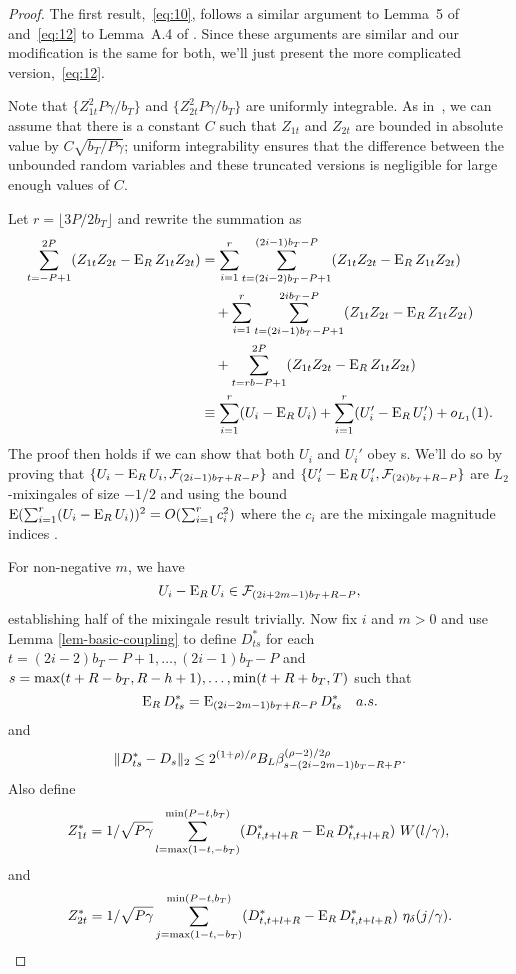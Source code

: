 \documentclass[11pt]{article}
\begin{document}
\begin{proof}
\newcommand{\UFiltration}[1]{\ensuremath{\mathcal{F}_{(#1)b_{T}+R-P}}}%
The first result,~\eqref{eq:10}, follows a similar argument to Lemma~5
of \citet{Jon:97} and~\eqref{eq:12} to Lemma~A.4 of \citet{JoD:00}.
Since these arguments are similar and our modification is the same for
both, we'll just present the more complicated version,~\eqref{eq:12}.

Note that $\{Z_{1t}^2 P\gamma/b_T\}$ and $\{Z_{2t}^2 P\gamma/b_T\}$
are uniformly integrable.  As in~\citet[Lemma A.4]{JoD:00}, we can
assume that there is a constant $C$ such that $Z_{1t}$ and $Z_{2t}$
are bounded in absolute value by $C\sqrt{b_T/P\gamma}$; uniform
integrability ensures that the difference between the unbounded random
variables and these truncated versions is negligible for large enough
values of $C$.

Let $r = \lfloor 3P/2b_T \rfloor$ and rewrite the summation as
\begin{align*}
  \sum_{t=-P+1}^{2P} (Z_{1t}Z_{2t} - \operatorname{E}_RZ_{1t}Z_{2t}) &= \sum_{i=1}^r \sum_{t=(2i-2)b_T-P+1}^{(2i-1)b_T-P} (Z_{1t}Z_{2t} - \operatorname{E}_RZ_{1t}Z_{2t}) \\
  &\quad+ \sum_{i=1}^r \sum_{t=(2i-1)b_T-P+1}^{2ib_T-P} (Z_{1t}Z_{2t} - \operatorname{E}_RZ_{1t}Z_{2t}) \\
  &\quad+ \sum_{t=r b - P + 1}^{2P} (Z_{1t}Z_{2t} - \operatorname{E}_RZ_{1t}Z_{2t}) \\
  &\equiv \sum_{i=1}^r (U_i - \operatorname{E}_R U_i) + \sum_{i=1}^r (U_i' - \operatorname{E}_R U_i') + o_{L_1}(1).
\end{align*}
The proof then holds if we can show that both $U_i$ and $U_i'$ obey
\lln s.  We'll do so by proving that $\{U_i -\E_R U_i,
\UFiltration{2i-1}\}$ and $\{U_i' - \E_R U_i', \UFiltration{2i}\}$ are
$L_2$-mixingales of size $-1/2$ and using the bound $\operatorname{E}(\sum_{i=1}^r (U_i -
\operatorname{E}_R U_i))^2 = O(\sum_{i=1}^r c_i^2)$ where the $c_i$ are the mixingale
magnitude indices \citep{Mcl:75}.

For non-negative $m$, we have
\begin{equation*}
U_i - \E_R U_i \in \UFiltration{2i+2m-1},
\end{equation*}
establishing half of the mixingale result trivially.  Now fix $i$ and $m >
0$ and use Lemma \ref{lem-basic-coupling} to define $D_{ts}^*$
for each $t =(2i-2)b_T-P+1,\dots,(2i-1)b_T-P$ and $s =
\max(t+R-b_T,R-h+1),\dots,\min(t+R+b_T,T)$ such that
\begin{equation*}
 \operatorname{E}_R D_{ts}^* = \operatorname{E}_{(2i-2m-1)b_T+R-P} D_{ts}^* \quad a.s.
\end{equation*}
and
\begin{equation*}
  \lVert D_{ts}^* - D_s \rVert_2 \leq 2^{(1+\rho)/\rho} B_L \beta^{(\rho-2)/2\rho}_{s - (2i-2m-1)b_T-R+P}.
\end{equation*}
Also define
\begin{equation*}
  Z_{1t}^* = 1/\sqrt{P\gamma} \sum_{l=\max(1-t,-b_T)}^{\min(P-t,b_T)}
  (D_{t,t+l+R}^* - \operatorname{E}_R D_{t,t+l+R}^*)\ W(l/\gamma), \\
\end{equation*}
and
\begin{equation*}
Z_{2t}^* = 1/\sqrt{P\gamma} \sum_{j=\vttLower}^{\vttUpper}
    (D_{t,t+l+R}^* - \E_R D_{t,t+l+R}^*)\ \kernelB{j/\gamma}.
\end{equation*}


\end{proof}
\end{document}
